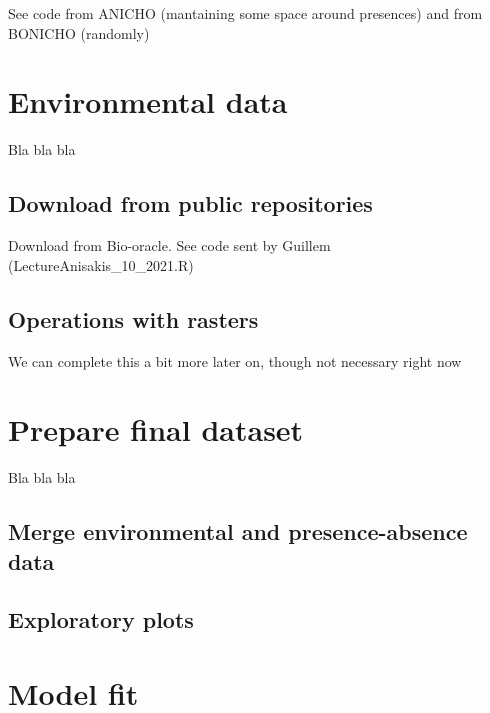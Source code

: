 \documentclass[
]{book}
\begin{document}
See code from ANICHO (mantaining some space around presences) and from BONICHO (randomly)

\hypertarget{environmental-data}{%
\chapter{Environmental data}\label{environmental-data}}

Bla bla bla

\hypertarget{download-from-public-repositories}{%
\section{Download from public repositories}\label{download-from-public-repositories}}

Download from Bio-oracle. See code sent by Guillem (LectureAnisakis\_10\_2021.R)

\hypertarget{operations-with-rasters}{%
\section{Operations with rasters}\label{operations-with-rasters}}

We can complete this a bit more later on, though not necessary right now

\hypertarget{prepare-final-dataset}{%
\chapter{Prepare final dataset}\label{prepare-final-dataset}}

Bla bla bla

\hypertarget{merge-environmental-and-presence-absence-data}{%
\section{Merge environmental and presence-absence data}\label{merge-environmental-and-presence-absence-data}}

\hypertarget{exploratory-plots}{%
\section{Exploratory plots}\label{exploratory-plots}}

\hypertarget{model-fit}{%
\chapter{Model fit}\label{model-fit}}
\end{document}

